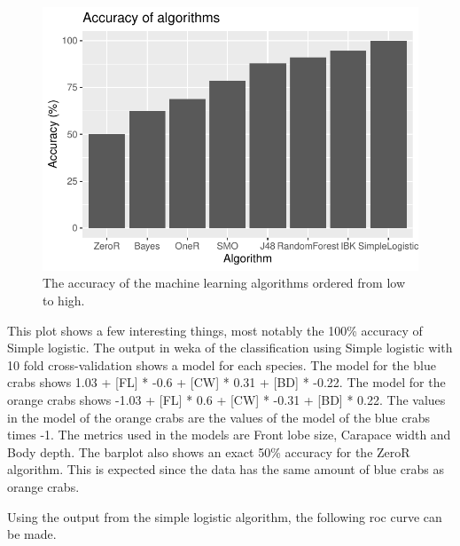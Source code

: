 \documentclass[
]{article}
\begin{document}
\begin{figure}[H]

{\centering \includegraphics{CrabProject_files/figure-latex/ml-1} 

}

\caption{The accuracy of the machine learning algorithms ordered from low to high.}\label{fig:ml}
\end{figure}

This plot shows a few interesting things, most notably the 100\%
accuracy of Simple logistic. The output in weka of the classification
using Simple logistic with 10 fold cross-validation shows a model for
each species. The model for the blue crabs shows 1.03 + {[}FL{]} * -0.6
+ {[}CW{]} * 0.31 + {[}BD{]} * -0.22. The model for the orange crabs
shows -1.03 + {[}FL{]} * 0.6 + {[}CW{]} * -0.31 + {[}BD{]} * 0.22. The
values in the model of the orange crabs are the values of the model of
the blue crabs times -1. The metrics used in the models are Front lobe
size, Carapace width and Body depth. The barplot also shows an exact
50\% accuracy for the ZeroR algorithm. This is expected since the data
has the same amount of blue crabs as orange crabs.

Using the output from the simple logistic algorithm, the following roc
curve can be made.
\end{document}
